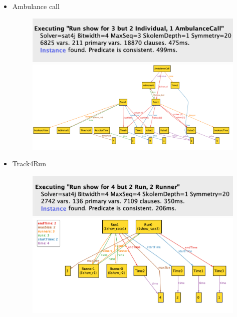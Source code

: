 \documentclass{article}
\begin{document}
\begin{legal}
\begin{itemize}
\begin{figure}[H]
			\end{figure}
			\item Ambulance call
			\begin{figure}[H]
		  				\includegraphics[width=\linewidth]{../images/alloy/automatedSOS-Run.png}
		  				\includegraphics[width=\linewidth]{../images/alloy/automatedSOS-World.png}
			\end{figure}
			\newpage
			\item Track4Run
			\begin{figure}[H]
		  				\includegraphics[width=\linewidth]{../images/alloy/track4Run-Run.png}
		  				\includegraphics[width=\linewidth]{../images/alloy/track4Run-World.png}
			\end{figure}
		\end{itemize}

\end{legal}
\end{document}
